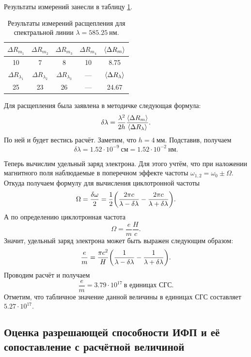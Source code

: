 \documentclass[12pt]{article}
\begin{document}
	Результаты измерений занесли в таблицу \ref{table:5}.
	\begin{table}[h!]
		\centering
		\begin{tabular}{|c c c c | c |} 
 			\hline
 			$\Delta R_{m_1}$ & $\Delta R_{m_2}$ & $\Delta R_{m_3}$ & $\Delta R_{m_4}$ & $\expval{\Delta R_m}$ \\
 			\hline
 			10 & 7 & 8 & 10 & 8.75 \\
 			\hline\hline
 			$\Delta R_{\lambda_1}$ & $\Delta R_{\lambda_2}$ & $\Delta R_{\lambda_3}$ & \---- & $\expval{\Delta R_\lambda}$ \\
 			\hline
 			25& 23& 26& \---- & 24.67\\
 			\hline
		\end{tabular}
		\caption{Результаты измерений расщепления для спектральной линии $\lambda = 585.25\ \text{нм}$.}
		\label{table:5}
	\end{table}
	Для расщепления была заявлена в методичке следующая формула:
	\begin{equation}
		\delta\lambda = \dfrac{\lambda^2}{2h}\dfrac{\expval{\Delta R_m}}{\expval{\Delta R_\lambda}}.
	\end{equation}
	По ней и будет вестись расчёт. Заметим, что $h = 4\ \text{мм}$. Подставив, получаем
	\begin{equation}
		\delta\lambda = 1.52 \cdot 10^{-9}\ \text{см} = 1.52 \cdot 10^{-2}\ \text{нм}.
	\end{equation}
	\par Теперь вычислим удельный заряд электрона. Для этого учтём, что при наложении магнитного поля наблюдаемые в поперечном эффекте частоты $\omega_{1,2} = \omega_0 \pm \Omega$. Откуда получаем формулу для вычисления циклотронной частоты
	\begin{equation}
		\Omega = \dfrac{\delta\omega}{2} = \dfrac12 \qty(\dfrac{2\pi c}{\lambda - \delta\lambda} - \dfrac{2\pi c}{\lambda + \delta\lambda}).
	\end{equation}
	А по определению циклотронная частота 
	\begin{equation}
		\Omega = \dfrac{e}{m} \dfrac{H}{c}.
	\end{equation}
	Значит, удельный заряд электрона может быть выражен следующим образом:
	\begin{equation}
		\dfrac{e}{m} = \dfrac{\pi c^2}{H}\qty(\dfrac{1}{\lambda - \delta\lambda} - \dfrac{1}{\lambda + \delta\lambda}).
	\end{equation}
	Проводим расчёт и получаем
	\begin{equation}
		\dfrac{e}{m} = 3.79\cdot10^{17}\ \text{в единицах СГС}.
	\end{equation}
	Отметим, что табличное значение данной величины в единицах СГС составляет $5.27\cdot10^{17}$.

	\subsection{Оценка разрешающей способности ИФП и её сопоставление с расчётной величиной}
\end{document}
